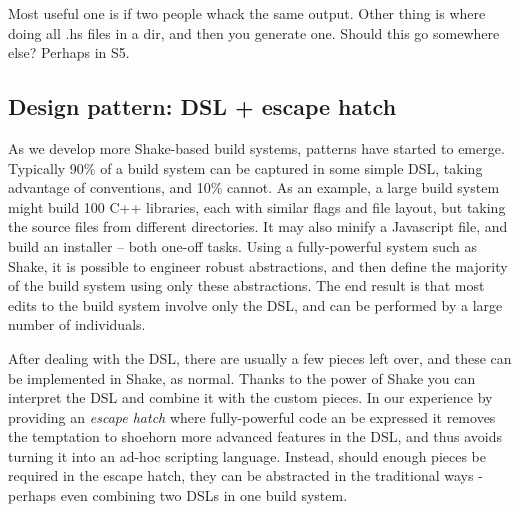 Most useful one is if two people whack the same output. Other thing is where doing all .hs files in a dir, and then you generate one. Should this go somewhere else? Perhaps in S5.

\subsection{Design pattern: DSL + escape hatch}


As we develop more Shake-based build systems, patterns have started to emerge. Typically 90\% of a build system can be captured in some simple DSL, taking advantage of conventions, and 10\% cannot. As an example, a large build system might build 100 C++ libraries, each with similar flags and file layout, but taking the source files from different directories. It may also minify a Javascript file, and build an installer -- both one-off tasks. Using a fully-powerful system such as Shake, it is possible to engineer robust abstractions, and then define the majority of the build system using only these abstractions. The end result is that most edits to the build system involve only the DSL, and can be performed by a large number of individuals.

After dealing with the DSL, there are usually a few pieces left over, and these can be implemented in Shake, as normal. Thanks to the power of Shake you can interpret the DSL and combine it with the custom pieces. In our experience by providing an \textit{escape hatch} where fully-powerful code an be expressed it removes the temptation to shoehorn more advanced features in the DSL, and thus avoids turning it into an ad-hoc scripting language. Instead, should enough pieces be required in the escape hatch, they can be abstracted in the traditional ways - perhaps even combining two DSLs in one build system.
